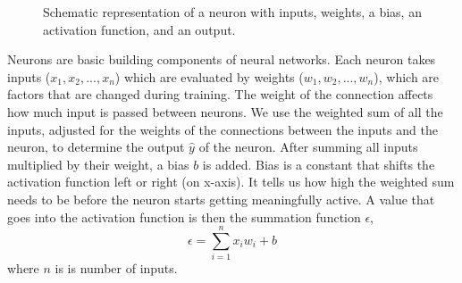 \begin{figure}[htp]
	\centering
	
	\caption{Schematic representation of a neuron with inputs, weights, a bias, an activation function, and an output.}
	\label{fig:neuron}
\end{figure}


Neurons are basic building components of neural networks. Each neuron takes inputs ($x_1, x_2, ..., x_n$) which are evaluated by weights ($w_1, w_2, ..., w_n$), which are factors that are changed during training. The weight of the connection affects how much input is passed between neurons. We use the weighted sum of all the inputs, adjusted for the weights of the connections between the inputs and the neuron, to determine the output $\hat{y}$ of the neuron. After summing all inputs multiplied by their weight, a bias $b$ is added. Bias is a constant that shifts the activation function left or right (on x-axis). It tells us how high the weighted sum needs to be before the neuron starts getting meaningfully active. A value that goes into the activation function is then the summation function $\epsilon$,
\begin{equation}
	\epsilon = \sum_{i=1}^{n} x_i w_i + b
	\label{eq:weighted_sum}
\end{equation}
where $n$ is is number of inputs.

